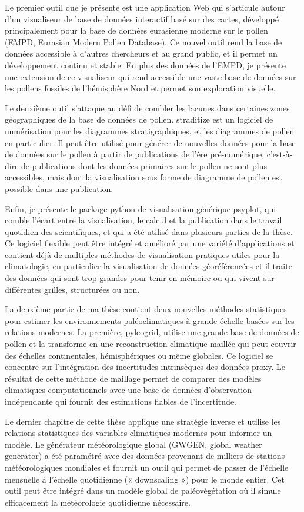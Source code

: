 \begin{thesisabstract}[]
Le premier outil que je présente est une application Web qui s'articule autour d'un visualiseur de base de données interactif basé sur des cartes, développé principalement pour la base de données eurasienne moderne sur le pollen (EMPD, Eurasian Modern Pollen Database). Ce nouvel outil rend la base de données accessible à d'autres chercheurs et au grand public, et il permet un développement continu et stable. En plus des données de l'EMPD, je présente une extension de ce visualiseur qui rend accessible une vaste base de données sur les pollens fossiles de l'hémisphère Nord et permet son exploration visuelle.

Le deuxième outil s'attaque au défi de combler les lacunes dans certaines zones géographiques de la base de données de pollen. straditize est un logiciel de numérisation pour les diagrammes stratigraphiques, et les diagrammes de pollen en particulier. Il peut être utilisé pour générer de nouvelles données pour la base de données sur le pollen à partir de publications de l’ère pré-numérique, c'est-à-dire de publications dont les données primaires sur le pollen ne sont plus accessibles, mais dont la visualisation sous forme de diagramme de pollen est possible dans une publication.

Enfin, je présente le package python de visualisation générique psyplot, qui comble l'écart entre la visualisation, le calcul et la publication dans le travail quotidien des scientifiques, et qui a été utilisé dans plusieurs parties de la thèse. Ce logiciel flexible peut être intégré et amélioré par une variété d'applications et contient déjà de multiples méthodes de visualisation pratiques utiles pour la climatologie, en particulier la visualisation de données géoréférencées et il traite des données qui sont trop grandes pour tenir en mémoire ou qui vivent sur différentes grilles, structurées ou non.

La deuxième partie de ma thèse contient deux nouvelles méthodes statistiques pour estimer les environnements paléoclimatiques à grande échelle basées sur les relations modernes. La première, pyleogrid, utilise une grande base de données de pollen et la transforme en une reconstruction climatique maillée qui peut couvrir des échelles continentales, hémisphériques ou même globales. Ce logiciel se concentre sur l'intégration des incertitudes intrinsèques des données proxy. Le résultat de cette méthode de maillage permet de comparer des modèles climatiques computationnels avec une base de données d'observation indépendante qui fournit des estimations fiables de l'incertitude.

Le dernier chapitre de cette thèse applique une stratégie inverse et utilise les relations statistiques des variables climatiques modernes pour informer un modèle. Le générateur météorologique global (GWGEN, global weather generator) a été paramétré avec des données provenant de milliers de stations météorologiques mondiales et fournit un outil qui permet de passer de l’échelle mensuelle à l’échelle quotidienne (« downscaling ») pour le monde entier. Cet outil peut être intégré dans un modèle global de paléovégétation où il simule efficacement la météorologie quotidienne nécessaire.
\end{thesisabstract}

